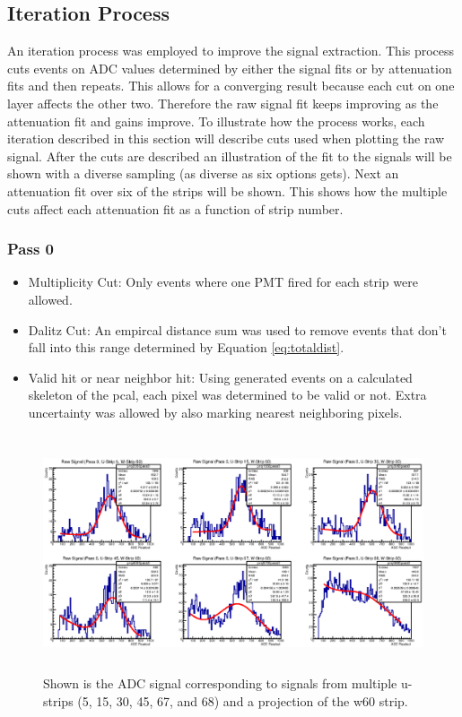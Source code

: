 \subsection{Iteration Process}
An iteration process was employed to improve the signal extraction. This process cuts events on
 ADC values determined by either the signal fits or by attenuation fits and then repeats. This 
 allows for a converging result because each cut on one layer affects the other two. Therefore
  the raw signal fit keeps improving as the attenuation fit and gains improve. To illustrate 
  how the process works, each iteration described in this section will describe cuts used when 
  plotting the raw signal. After the cuts are described an illustration of the fit to the signals 
  will be shown with a diverse sampling (as diverse as six options gets). Next an attenuation 
  fit over six of the strips will be shown. This shows how the multiple cuts affect each attenuation 
  fit as a function of strip number. 

\clearpage
\FloatBarrier
\subsubsection{Pass 0}
\begin{itemize}
    \item Multiplicity Cut: Only events where one PMT fired for each strip were allowed.
    \item Dalitz Cut: An empircal distance sum was used to remove events that don't fall into 
    this range determined by Equation \ref{eq:totaldist}.
    \item Valid hit or near neighbor hit: Using generated events on a calculated skeleton of 
    the pcal, each pixel was determined to be valid or not. Extra uncertainty was allowed by 
    also marking nearest neighboring pixels.
\end{itemize}

\begin{figure}[h]
    \centering
    \includegraphics[height= 2.75in, keepaspectratio = true]{pass0}
    \caption{Shown is the ADC signal corresponding to signals from multiple u-strips 
    (5, 15, 30, 45, 67, and 68) and a projection of the w60 strip.}
    \label{fig:pass0}
\end{figure}

